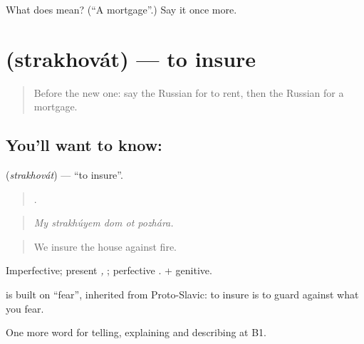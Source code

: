 \begin{tcolorbox}[breakable,colback=teal!4,colframe=teal!35!black,title={Before you move on}]
What does  mean? (\textquotedblleft{}A mortgage\textquotedblright{}.) Say it once more.
\end{tcolorbox}
\section[\texorpdfstring{\ru{страховать} (strakhovát)}{страховать (strakhovát)}]{ (strakhovát) — to insure}

\label{lesson:RU-C398-strakhovat}



\begin{quote}
Before the new one: say the Russian for to rent, then the Russian for a mortgage.
\end{quote}

\subsection*{You'll want to know: }
\textbf{} (\emph{strakhovát}) — \textquotedblleft{}to insure\textquotedblright{}.

\begin{quote}
    .
\end{quote}

\begin{quote}
\emph{My strakhúyem dom ot pozhára.}
\end{quote}

\begin{quote}
We insure the house against fire.
\end{quote}

Imperfective; present \emph{, }; perfective \emph{}. \emph{ } + genitive.

\begin{cousinweb}
\textbf{} is built on \emph{} \textquotedblleft{}fear\textquotedblright{}, inherited from Proto-Slavic: to insure is to guard against what you fear.
\end{cousinweb}

\begin{grammarlens}[title={What you've built}]
One more word for telling, explaining and describing at B1.
\end{grammarlens}

